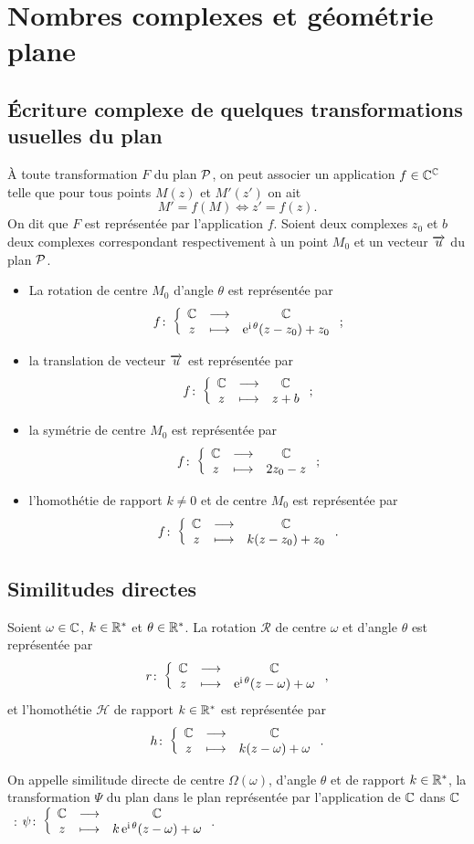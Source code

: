 \section{Nombres complexes et géométrie plane}
\label{sec:complexesetgeometrie}
\subsection{Écriture complexe de quelques transformations usuelles du plan}
\label{subsec:ecriturecomplexeettransformations}
À toute transformation \(F\) du plan \(\P\), on peut associer un application \(f \in \C^{\C}\) telle que pour tous points \(M(z)\) et \(M'(z')\) on ait
\begin{equation}
  M'=f(M) \iff z'=f(z).
\end{equation}
On dit que \(F\) est représentée par l'application \(f\). Soient deux complexes \(z_0\) et \(b\) deux complexes correspondant respectivement à un point \(M_0\) et un vecteur \(\vect{u}\) du plan \(\P\).
\begin{itemize}
\item La rotation de centre \(M_0\) d'angle \(\theta\) est représentée par
  \begin{equation}
    \fonction{f}{\C}{\C}{z}{\expc{}{\theta}(z-z_0) +z_0};
  \end{equation}
\item la translation de vecteur \(\vect{u}\) est représentée par
  \begin{equation}
    \fonction{f}{\C}{\C}{z}{z+b};
  \end{equation}
\item la symétrie de centre \(M_0\) est représentée par
  \begin{equation}
    \fonction{f}{\C}{\C}{z}{2z_0-z};
  \end{equation}
\item l'homothétie de rapport \(k\neq 0\) et de centre \(M_0\) est représentée par
  \begin{equation}
    \fonction{f}{\C}{\C}{z}{k(z-z_0)+z_0}.
  \end{equation}
\end{itemize}
%
\subsection{Similitudes directes}
\label{subsec:simdirecte}
Soient \(\omega \in \C\), \(k\in \R^*\) et \(\theta \in \R^*\). La rotation \(\mathcal{R}\) de centre \(\omega\) et d'angle \(\theta\) est représentée par \[\fonction{r}{\C}{\C}{z}{\expc{}{\theta}(z-\omega)+\omega},\] et l'homothétie \(\mathcal{H}\) de rapport \(k \in \R^*\) est représentée par \[\fonction{h}{\C}{\C}{z}{k(z-\omega)+\omega}.\]
%
\begin{defdef}
  On appelle similitude directe de centre \(\Omega(\omega)\), d'angle \(\theta\) et de rapport \(k \in \R^*\), la transformation \(\Psi\) du plan dans le plan représentée par l'application de \(\C\) dans \(\C\)~: \(\fonction{\psi}{\C}{\C}{z}{\expc{k}{\theta}(z-\omega)+\omega}\).
\end{defdef}

